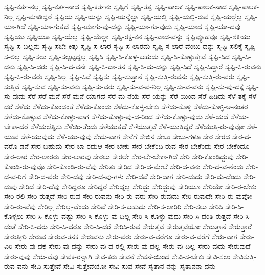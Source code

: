 {ಸೃಷ್ಟಿ-ಕರ್ತ-ನಲ್ಲ
ಸೃಷ್ಟಿ-ಕರ್ತ-ನಾದ
ಸೃಷ್ಟಿ-ಕರ್ತನು
ಸೃಷ್ಟಿಗೆ
ಸೃಷ್ಟಿ-ತತ್ವ
ಸೃಷ್ಟಿ-ಪಾಲಕ
ಸೃಷ್ಟಿ-ಪಾಲಕ-ನಾದ
ಸೃಷ್ಟಿ-ಪಾಲಕ-ನಿಲ್ಲ
ಸೃಷ್ಟಿ-ಮಾಡಿದ್ದರೆ
ಸೃಷ್ಟಿಯ
ಸೃಷ್ಟಿ-ಯನ್ನು
ಸೃಷ್ಟಿ-ಯನ್ನೆಲ್ಲಾ
ಸೃಷ್ಟಿ-ಯಲ್ಲಿ
ಸೃಷ್ಟಿ-ಯಲ್ಲಿ-ರುವ
ಸೃಷ್ಟಿ-ಯಲ್ಲೆಲ್ಲ
ಸೃಷ್ಟಿ-ಯಾ-ಗಿದೆ
ಸೃಷ್ಟಿ-ಯಾ-ಗುತ್ತದೆ
ಸೃಷ್ಟಿ-ಯಾಗು-ವು-ದನ್ನು
ಸೃಷ್ಟಿ-ಯಾ-ಗು-ವುದು
ಸೃಷ್ಟಿ-ಯಾದ
ಸೃಷ್ಟಿ-ಯಾ-ದವು
ಸೃಷ್ಟಿಯು
ಸೃಷ್ಟಿಯೂ
ಸೃಷ್ಟಿ-ಯೆಲ್ಲ
ಸೃಷ್ಟಿ-ಯೆಲ್ಲಾ
ಸೃಷ್ಟಿ-ರಕ್ಷ-ಕನ
ಸೃಷ್ಟಿ-ವಾದ-ವನ್ನು
ಸೃಷ್ಟಿವ್ಯೂಹವೂ
ಸೃಷ್ಟಿ-ಶಕ್ತಿಯು
ಸೃಷ್ಟಿ-ಸ-ಬಲ್ಲನು
ಸೃಷ್ಟಿ-ಸಬೇ-ಕಿತ್ತು
ಸೃಷ್ಟಿ-ಸ-ಲಾರ
ಸೃಷ್ಟಿ-ಸ-ಲಾರದು
ಸೃಷ್ಟಿ-ಸ-ಲಾರೆ-ವೆಂಬು-ದನ್ನು
ಸೃಷ್ಟಿ-ಸಲಿಕ್ಕೆ
ಸೃಷ್ಟಿ-ಸ-ಲಿಲ್ಲ
ಸೃಷ್ಟಿ-ಸಲು
ಸೃಷ್ಟಿ-ಸಲ್ಪಟ್ಟದ್ದಲ್ಲ
ಸೃಷ್ಟಿಸಿ
ಸೃಷ್ಟಿ-ಸಿ-ಕೊಳ್ಳ-ಬಹುದು
ಸೃಷ್ಟಿ-ಸಿ-ಕೊಳ್ಳುತ್ತೇವೆ
ಸೃಷ್ಟಿ-ಸಿದ
ಸೃಷ್ಟಿ-ಸಿ-ದನು
ಸೃಷ್ಟಿ-ಸಿ-ದರು
ಸೃಷ್ಟಿ-ಸಿ-ದ-ವನೇ
ಸೃಷ್ಟಿ-ಸಿ-ದಾ-ತನ
ಸೃಷ್ಟಿ-ಸಿ-ದು-ದನ್ನು
ಸೃಷ್ಟಿ-ಸಿದೆ
ಸೃಷ್ಟಿ-ಸಿದ್ದಾರೆ
ಸೃಷ್ಟಿ-ಸಿ-ರುವನು
ಸೃಷ್ಟಿ-ಸಿ-ರು-ವರು
ಸೃಷ್ಟಿ-ಸಿಲ್ಲ
ಸೃಷ್ಟಿ-ಸಿವೆ
ಸೃಷ್ಟಿಸು
ಸೃಷ್ಟಿ-ಸುತ್ತಾನೆ
ಸೃಷ್ಟಿ-ಸುತ್ತಿ-ರುವನು
ಸೃಷ್ಟಿ-ಸುತ್ತಿ-ರು-ವರು
ಸೃಷ್ಟಿ-ಸುತ್ತಿವೆ
ಸೃಷ್ಟಿ-ಸುವ
ಸೃಷ್ಟಿ-ಸು-ವನು
ಸೃಷ್ಟಿ-ಸು-ವರು
ಸೃಷ್ಟಿ-ಸು-ವ-ವ-ನಿಲ್ಲ
ಸೃಷ್ಟಿ-ಸು-ವ-ವನು
ಸೃಷ್ಟಿ-ಸು-ವು-ದಕ್ಕೆ
ಸೃಷ್ಟಿ-ಸು-ವುದು
ಸೆರೆ
ಸೆರೆ-ಮನೆ
ಸೆರೆ-ಮನೆ-ಯಾಗದೆ
ಸೆರೆ-ಮ-ನೆಯೆ
ಸೆರೆ-ಯನ್ನು
ಸೆರೆ-ಯಿಂದ
ಸೆರೆ-ಹಿಡಿದು
ಸೆಳೆ-ತಕ್ಕೆ
ಸೆಳೆ-ದರೆ
ಸೆಳೆದು
ಸೆಳೆದು-ಕೊಂಡಂತೆ
ಸೆಳೆದು-ಕೊಂಡು
ಸೆಳೆದು-ಕೊಳ್ಳ-ಬೇಕು
ಸೆಳೆದು-ಕೊಳ್ಳಿ
ಸೆಳೆದು-ಕೊಳ್ಳಿ-ಅ-ನಂತರ
ಸೆಳೆದು-ಕೊಳ್ಳುವ
ಸೆಳೆದು-ಕೊಳ್ಳು-ವಾಗ
ಸೆಳೆದು-ಕೊಳ್ಳು-ವು-ದ-ರಿಂದ
ಸೆಳೆದು-ಕೊಳ್ಳು-ವುದು
ಸೆಳೆ-ಯದೆ
ಸೆಳೆಯ-ಬೇಕಾ-ದರೆ
ಸೆಳೆಯಲೆತ್ನಿಸು
ಸೆಳೆಯಿ-ತೆಂದು
ಸೆಳೆಯುತ್ತದೆ
ಸೆಳೆಯುತ್ತವೆ
ಸೆಳೆ-ಯುತ್ತಿದ್ದರೆ
ಸೆಳೆಯುತ್ತಿ-ರು-ವುವೋ
ಸೆಳೆ-ಯುವ
ಸೆಳೆ-ಯುವುದು
ಸೆಳೆ-ಯು-ವುವು
ಸೇದು-ವಾಗ
ಸೇನೆಗೆ
ಸೇಬಿನ
ಸೇಬು
ಸೇಬು-ಗಳೂ
ಸೇರ
ಸೇರದ
ಸೇರ-ದ-ವರೊ-ಡನೆ
ಸೇರ-ಬಹುದು
ಸೇರ-ಬಾ-ರದುಆ
ಸೇರ-ಬೇಕು
ಸೇರ-ಬೇಕೆಂದಿ-ರುವ
ಸೇರ-ಬೇಕೆಂದು
ಸೇರ-ಬೇಕೆಂದೂ
ಸೇರ-ಲಾರ
ಸೇರ-ಲಾರರು
ಸೇರ-ಲಾರವು
ಸೇರಲು
ಸೇರಲೇ
ಸೇರ-ಲೇ-ಬೇಕಾ-ಗಿದೆ
ಸೇರಿ
ಸೇರಿ-ಕೊಂಡಿದ್ದುವು
ಸೇರಿ-ಕೊಂಡಿ-ರು-ವುವೊ
ಸೇರಿ-ಕೊಂಡಿ-ರು-ವೆವು
ಸೇರಿತು
ಸೇರಿದ
ಸೇರಿ-ದ-ಮೇಲೆ
ಸೇರಿ-ದ-ವನು
ಸೇರಿ-ದ-ವ-ನೆಂದು
ಸೇರಿ-ದ-ವ-ರಿಗೆ
ಸೇರಿ-ದ-ವರು
ಸೇರಿ-ದವು
ಸೇರಿ-ದ-ವು-ಗಳು
ಸೇರಿ-ದವೆ
ಸೇರಿ-ದಾಗ
ಸೇರಿ-ದುದು
ಸೇರಿ-ದು-ದೆಂದು
ಸೇರಿ-ದುವು
ಸೇರಿದೆ
ಸೇರಿ-ದೆವು
ಸೇರಿದ್ದರೂ
ಸೇರಿದ್ದರೆ
ಸೇರಿದ್ದಲ್ಲ
ಸೇರಿದ್ದು
ಸೇರಿದ್ದುವು
ಸೇರಿಯೂ
ಸೇರಿಯೇ
ಸೇರಿ-ರ-ಬೇಕು
ಸೇರಿ-ರಲಿ
ಸೇರಿ-ರುತ್ತದೆ
ಸೇರಿ-ರುವ
ಸೇರಿ-ರುವನು
ಸೇರಿ-ರು-ವರು
ಸೇರಿ-ರುವುದು
ಸೇರಿ-ರುವುದೇ
ಸೇರಿ-ರು-ವುವೋ
ಸೇರಿ-ರು-ವೆವು
ಸೇರಿಲ್ಲ
ಸೇರಿಲ್ಲ-ವೆಂದು
ಸೇರಿವೆ
ಸೇರಿ-ಸ-ಬಹುದು
ಸೇರಿ-ಸ-ಲಾರಿರಿ
ಸೇರಿ-ಸಲು
ಸೇರಿಸಿ
ಸೇರಿ-ಸಿ-ಕೊಳ್ಳಲು
ಸೇರಿ-ಸಿ-ಕೊಳ್ಳು-ವಷ್ಟು
ಸೇರಿ-ಸಿ-ಕೊಳ್ಳು-ವು-ದಿಲ್ಲ
ಸೇರಿ-ಸಿ-ಕೊಳ್ಳು-ವುದು
ಸೇರಿ-ಸಿ-ದಂತಿ-ರುತ್ತದೆ
ಸೇರಿ-ಸಿ-ದಂತೆ
ಸೇರಿ-ಸಿ-ದರು
ಸೇರಿ-ಸಿ-ದರೂ
ಸೇರಿ-ಸಿ-ದರೆ
ಸೇರಿಸಿ-ರುವ
ಸೇರುತ್ತವೆ
ಸೇರುತ್ತವೆಯೋ
ಸೇರುತ್ತಾನೆ
ಸೇರುತ್ತಾರೆ
ಸೇರುತ್ತೀರಿ
ಸೇರುವ
ಸೇರುವ-ತನಕ
ಸೇರುವನು
ಸೇರು-ವರು
ಸೇರು-ವ-ವರೆಗೂ
ಸೇರು-ವ-ವರೆಗೆ
ಸೇರು-ವಾಗ
ಸೇರು-ವಿರಿ
ಸೇರು-ವು-ದಕ್ಕೆ
ಸೇರು-ವು-ದನ್ನು
ಸೇರು-ವು-ದ-ರಲ್ಲಿ
ಸೇರು-ವು-ದಲ್ಲ
ಸೇರು-ವು-ದಿಲ್ಲ
ಸೇರು-ವುದು
ಸೇರುವುದೆ
ಸೇರು-ವುವು
ಸೇರು-ವೆವು
ಸೇವಕ-ರನ್ನಾಗಿ
ಸೇವ-ಕರು
ಸೇವನೆ
ಸೇವನೆ-ಯಿಂದ
ಸೇವಿ-ಸ-ಬೇಕು
ಸೇವಿ-ಸಲು
ಸೇವಿಸುತ್ತಿ-ರುವ-ವನು
ಸೇವಿ-ಸುತ್ತೇವೆ
ಸೇವಿ-ಸುತ್ತೇವೆಯೋ
ಸೇವಿ-ಸುವ
ಸೇವೆ
ಸೈತಾನ-ನನ್ನು
ಸೈತಾನನಾ-ದನು
}
